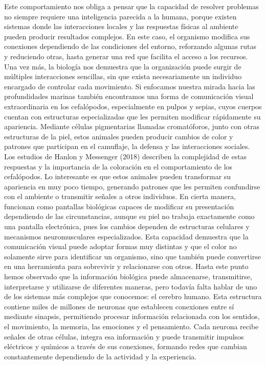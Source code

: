 \documentclass[12pt]{article}
\begin{document}
Este comportamiento nos obliga a pensar que la capacidad de resolver problemas no siempre requiere una inteligencia parecida a la humana, porque existen sistemas donde las interacciones locales y las respuestas físicas al ambiente pueden producir resultados complejos. En este caso, el organismo modifica sus conexiones dependiendo de las condiciones del entorno, reforzando algunas rutas y reduciendo otras, hasta generar una red que facilita el acceso a los recursos. Una vez más, la biología nos demuestra que la organización puede surgir de múltiples interacciones sencillas, sin que exista necesariamente un individuo encargado de controlar cada movimiento.
Si enfocamos nuestra mirada hacia las profundidades marinas también encontramos una forma de comunicación visual extraordinaria en los cefalópodos, especialmente en pulpos y sepias, cuyos cuerpos cuentan con estructuras especializadas que les permiten modificar rápidamente su apariencia. Mediante células pigmentarias llamadas cromatóforos, junto con otras estructuras de la piel, estos animales pueden producir cambios de color y patrones que participan en el camuflaje, la defensa y las interacciones sociales. Los estudios de Hanlon y Messenger (2018) describen la complejidad de estas respuestas y la importancia de la coloración en el comportamiento de los cefalópodos.
Lo interesante es que estos animales pueden transformar su apariencia en muy poco tiempo, generando patrones que les permiten confundirse con el ambiente o transmitir señales a otros individuos. En cierta manera, funcionan como pantallas biológicas capaces de modificar su presentación dependiendo de las circunstancias, aunque su piel no trabaja exactamente como una pantalla electrónica, pues los cambios dependen de estructuras celulares y mecanismos neuromusculares especializados. Esta capacidad demuestra que la comunicación visual puede adoptar formas muy distintas y que el color no solamente sirve para identificar un organismo, sino que también puede convertirse en una herramienta para sobrevivir y relacionarse con otros.
Hasta este punto hemos observado que la información biológica puede almacenarse, transmitirse, interpretarse y utilizarse de diferentes maneras, pero todavía falta hablar de uno de los sistemas más complejos que conocemos: el cerebro humano. Esta estructura contiene miles de millones de neuronas que establecen conexiones entre sí mediante sinapsis, permitiendo procesar información relacionada con los sentidos, el movimiento, la memoria, las emociones y el pensamiento. Cada neurona recibe señales de otras células, integra esa información y puede transmitir impulsos eléctricos y químicos a través de sus conexiones, formando redes que cambian constantemente dependiendo de la actividad y la experiencia.
\end{document}
